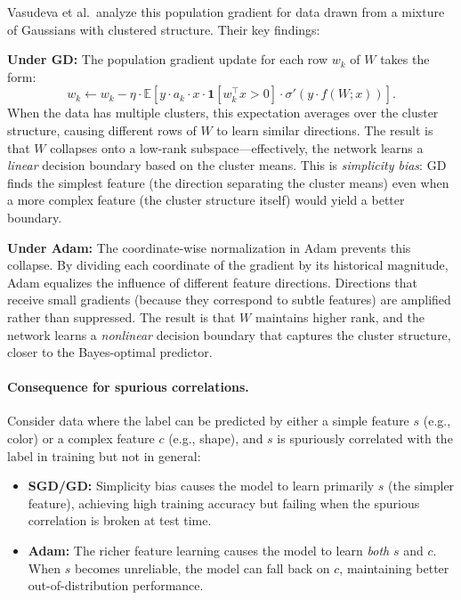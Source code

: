 \documentclass{article}
\begin{document}
Vasudeva et al.\ analyze this population gradient for data drawn from a mixture of Gaussians with clustered structure. Their key findings:

\textbf{Under GD:} The population gradient update for each row $w_k$ of $W$ takes the form:
\begin{equation}
    w_k \leftarrow w_k - \eta \cdot \mathbb{E}\left[ y \cdot a_k \cdot x \cdot \mathbf{1}[w_k^\top x > 0] \cdot \sigma'(y \cdot f(W;x)) \right].
\end{equation}
When the data has multiple clusters, this expectation averages over the cluster structure, causing different rows of $W$ to learn similar directions. The result is that $W$ collapses onto a low-rank subspace---effectively, the network learns a \emph{linear} decision boundary based on the cluster means. This is \emph{simplicity bias}: GD finds the simplest feature (the direction separating the cluster means) even when a more complex feature (the cluster structure itself) would yield a better boundary.

\textbf{Under Adam:} The coordinate-wise normalization in Adam prevents this collapse. By dividing each coordinate of the gradient by its historical magnitude, Adam equalizes the influence of different feature directions. Directions that receive small gradients (because they correspond to subtle features) are amplified rather than suppressed. The result is that $W$ maintains higher rank, and the network learns a \emph{nonlinear} decision boundary that captures the cluster structure, closer to the Bayes-optimal predictor.

\paragraph{Consequence for spurious correlations.} Consider data where the label can be predicted by either a simple feature $s$ (e.g., color) or a complex feature $c$ (e.g., shape), and $s$ is spuriously correlated with the label in training but not in general:
\begin{itemize}[leftmargin=*]
    \item \textbf{SGD/GD:} Simplicity bias causes the model to learn primarily $s$ (the simpler feature), achieving high training accuracy but failing when the spurious correlation is broken at test time.
    \item \textbf{Adam:} The richer feature learning causes the model to learn \emph{both} $s$ and $c$. When $s$ becomes unreliable, the model can fall back on $c$, maintaining better out-of-distribution performance.
\end{itemize}
\end{document}
